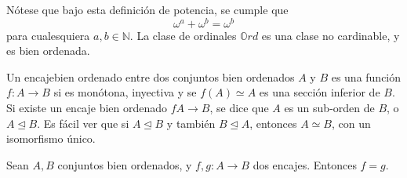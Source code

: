 Nótese que bajo esta definición de potencia, se cumple que 
$$\omega^a+\omega^b=\omega^b$$
para cualesquiera $a,b\in\mathbb{N}$.
La clase de ordinales $\mathbb{O}rd$ es una clase no cardinable, y es bien ordenada.
\begin{definition}
Un encajebien ordenado entre dos conjuntos bien ordenados $A$ y $B$ es una función $f:A\to B$ si es monótona, inyectiva y se $f(A)\simeq A$ es una sección inferior de $B$.
Si existe un encaje bien ordenado $fA\to B$, se dice que $A$ es un sub-orden de $B$, o $A\trianglelefteq B$.
Es fácil ver que si $A\trianglelefteq B$ y también $B\trianglelefteq A$, entonces $A\simeq B$, con un isomorfismo único.
\end{definition}
\begin{lemma}%
  Sean $A, B$ conjuntos bien ordenados, y $f,g:A\to B$ dos encajes. Entonces $f=g$.
\end{lemma}
